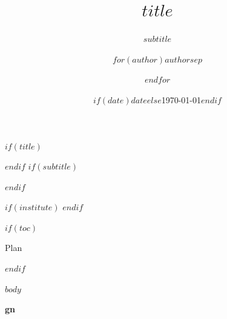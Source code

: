 

\usepackage[utf8]{inputenc}
\usepackage[T1]{fontenc}
\usepackage{amsmath}

\providecommand{\tightlist}{%
  \setlength{\itemsep}{0pt}\setlength{\parskip}{0pt}}
\providecommand{\pandocbounded}[1]{#1}

$if(title)$
\title{$title$}
$endif$
$if(subtitle)$
\subtitle{$subtitle$}
$endif$
\author{$for(author)$$author$$sep$ \and $endfor$}
$if(institute)$
$endif$
\date{$if(date)$$date$$else$\today$endif$}



\maketitleframe

$if(toc)$
\begin{frame}{Plan}
  \tableofcontents
\end{frame}
$endif$

$body$

\begin{frame}[plain]
  \begin{center}
    \vfill
    {\Huge\bfseries\color{stplwhite} gn}
    \vfill
  \end{center}
\end{frame}


